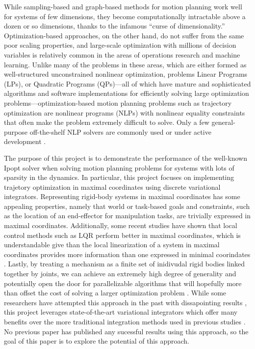 \documentclass[conference]{IEEEtran}
\begin{document}
While sampling-based and graph-based methods for motion planning work well for systems of 
few dimensions, they become computationally intractable above a dozen or so dimensions,
thanks to the infamous ``curse of dimensionality.'' Optimization-based 
approaches, on the other hand, do not suffer from the same poor scaling properties, and
large-scale optimization with millions of decision variables is relatively common in the 
areas of operations research and machine learning. Unlike many of the problems in these 
areas, which are either formed as well-structured unconstrained nonlinear optimization, 
problems Linear Programs (LPs), or Quadratic Programs (QPs)---all of which have mature and 
sophisticated algorithms and software implementations for efficiently solving large 
optimization problems---optimization-based motion planning problems such as trajectory 
optimization are nonlinear programs (NLPs) with nonlinear equality constraints that often 
make the problem extremely difficult to solve. Only a few general-purpose off-the-shelf 
NLP solvers are commonly used or under active development 
\cite{wachter_implementation_2006,gill_SNOPT_2005}.

The purpose of this project is to demonstrate the performance of the well-known Ipopt solver
when solving motion planning problems for systems with lots of sparsity in the dynamics. 
In particular, this project focuses on implementing trajetory optimization in maximal 
coordinates using discrete variational integrators. Representing rigid-body systems in 
maximal coordinates has some appealing properties, namely that world or task-based goals 
and constraints, such as the location of an end-effector for manipulation tasks, are 
trivially expressed in maximal coordinates. Additionally, some recent studies have shown
that local control methods such as LQR perform better in maximal coordinates, which is 
understandable give than the local linearization of a system in maximal coordinates provides
more information than one expressed in minimal coorindates \cite{brudigam_LinearTime_2020,
brudigam2021linear}.  Lastly, by treating a 
mechanism as a finite set of inidivudal rigid bodies linked together by joints, we can 
achieve an extremely high degree of generality and potentially open the door for 
parallelizable algorithms that will hopefully more than offset the cost of solving a larger
optimization problem \cite{baraff_Lineartime_1996}. While some researchers have attempted 
this approach in the past with
dissapointing results \cite{knemeyer2020minor,}, this project leverages state-of-the-art 
variational integrators 
which offer many benefits over the more traditional integration methods used in previous 
studies \cite{manchester_Variational_2017,brudigam_LinearTime_2020,marsden2001discrete}. 
No previous paper has published any sucessful results using this approach, so 
the goal of this paper is to explore the potential of this approach.
\end{document}
